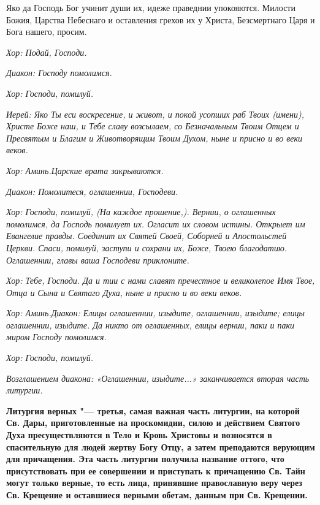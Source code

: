 Яко да Господь Бог учинит души их, идеже праведнии упокояются. Милости Божия, Царства Небеснаго и оставления грехов их у Христа, Безсмертнаго Царя и Бога нашего, просим.


\itshape Хор:\normalfont{} Подай, Господи.


\itshape Диакон:\normalfont{} Господу помолимся.


\itshape Хор:\normalfont{} Господи, помилуй.


\itshape Иерей:\normalfont{} Яко Ты еси воскресение, и живот, и покой усопших раб Твоих \itshape (имени)\normalfont{}, Христе Боже наш, и Тебе славу возсылаем, со Безначальным Твоим Отцем и Пресвятым и Благим и Животворящим Твоим Духом, ныне и присно и во веки веков.


\itshape Хор\normalfont{}: Аминь.\itshape  Царские врата закрываются.\normalfont{}




\itshape Диакон:\normalfont{} Помолитеся, оглашеннии, Господеви.


\itshape Хор:\normalfont{} Господи, помилуй, \itshape (На каждое прошение,)\normalfont{}. Вернии, о оглашенных помолимся, да Господь помилует их. Огласит их словом истины. Открыет им Евангелие правды. Соединит их Святей Своей, Соборней и Апостольстей Церкви. Спаси, помилуй, заступи и сохрани их, Боже, Твоею благодатию. Оглашеннии, главы ваша Господеви приклоните.


\itshape Хор:\normalfont{} Тебе, Господи. Да и тии с нами славят пречестное и великолепое Имя Твое, Отца и Сына и Святаго Духа, ныне и присно и во веки веков.


\itshape Хор:\normalfont{} Аминь.\itshape  Диакон:\normalfont{} Елицы оглашеннии, изыдите, оглашеннии, изыдите; елицы оглашеннии, изыдите. Да никто от оглашенных, елицы вернии, паки и паки миром Господу помолимся.


\itshape Хор:\normalfont{} Господи, помилуй.


\itshape Возглашением диакона: «Оглашеннии, изыдите...» заканчивается вторая часть литургии.\normalfont{}\mychapterending

 


\bfseries Литургия верных\normalfont{} "--- третья, самая важная часть литургии, на которой Св. Дары, приготовленные на проскомидии, силою и действием Святого Духа пресуществляются в Тело и Кровь Христовы и возносятся в спасительную для людей жертву Богу Отцу, а затем преподаются верующим для причащения. Эта часть литургии получила название оттого, что присутствовать при ее совершении и приступать к причащению Св. Тайн могут только верные, то есть лица, принявшие православную веру через Св. Крещение и оставшиеся верными обетам, данным при Св. Крещении.



